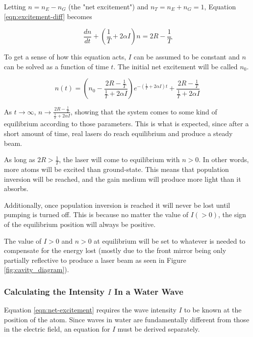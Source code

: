 \documentclass[12pt]{article}
\begin{document}
Letting $n = n_E - n_G$ (the "net excitement") and $n_T = n_E + n_G = 1$, Equation \ref{eqn:excitement-diff} becomes

\begin{equation}\label{eqn:net-excitement}
    \frac{dn}{dt} + \left(\frac{1}{T} + 2 \alpha I \right) n = 2R - \frac{1}{T}
\end{equation}

\vspace{0.5cm}

\noindent To get a sense of how this equation acts, $I$ can be assumed to be constant and $n$ can be solved as a function of time $t$. The initial net excitement will be called $n_0$.

\begin{equation}
    n(t) = \left(n_0 - \frac{2R - \frac{1}{T}}{\frac{1}{T} + 2 \alpha I}\right)e^{-\left(\frac{1}{T} + 2 \alpha I\right)t} + \frac{2R - \frac{1}{T}}{\frac{1}{T} + 2 \alpha I}
\end{equation}

As $t \rightarrow \infty$, $n \rightarrow \frac{2R - \frac{1}{T}}{\frac{1}{T} + 2 \alpha I}$, showing that the system comes to some kind of equilibrium according to those parameters. This is what is expected, since after a short amount of time, real lasers do reach equilibrium and produce a steady beam.

As long as $2R > \frac{1}{T}$, the laser will come to equilibrium with $n > 0$. In other words, more atoms will be excited than ground-state. This means that population inversion will be reached, and the gain medium will produce more light than it absorbs.

Additionally, once population inversion is reached it will never be lost until pumping is turned off. This is because no matter the value of $I (> 0)$, the sign of the equilibrium position will always be positive.

The value of $I > 0$ and $n > 0$ at equilibrium will be set to whatever is needed to compensate for the energy lost (mostly due to the front mirror being only partially reflective to produce a laser beam as seen in Figure \ref{fig:cavity_diagram}).

\subsubsection{Calculating the Intensity $I$ In a Water Wave}

Equation \ref{eqn:net-excitement} requires the wave intensity $I$ to be known at the position of the atom. Since waves in water are fundamentally different from those in the electric field, an equation for $I$ must be derived separately.
\end{document}
